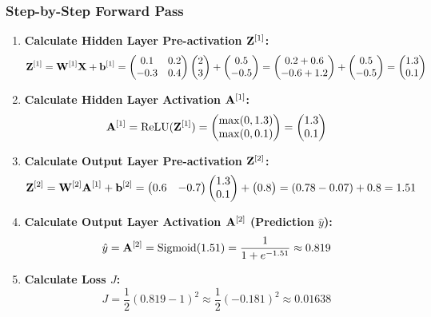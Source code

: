 \subsubsection{Step-by-Step Forward Pass}
\begin{enumerate}
    \item \textbf{Calculate Hidden Layer Pre-activation $\mathbf{Z}^{[1]}$:}
    \[ \mathbf{Z}^{[1]} = \mathbf{W}^{[1]}\mathbf{X} + \mathbf{b}^{[1]} = \begin{pmatrix} 0.1 & 0.2 \\ -0.3 & 0.4 \end{pmatrix} \begin{pmatrix} 2 \\ 3 \end{pmatrix} + \begin{pmatrix} 0.5 \\ -0.5 \end{pmatrix} = \begin{pmatrix} 0.2+0.6 \\ -0.6+1.2 \end{pmatrix} + \begin{pmatrix} 0.5 \\ -0.5 \end{pmatrix} = \begin{pmatrix} 1.3 \\ 0.1 \end{pmatrix} \]

    \item \textbf{Calculate Hidden Layer Activation $\mathbf{A}^{[1]}$:}
    \[ \mathbf{A}^{[1]} = \text{ReLU}(\mathbf{Z}^{[1]}) = \begin{pmatrix} \max(0, 1.3) \\ \max(0, 0.1) \end{pmatrix} = \begin{pmatrix} 1.3 \\ 0.1 \end{pmatrix} \]

    \item \textbf{Calculate Output Layer Pre-activation $\mathbf{Z}^{[2]}$:}
    \[ \mathbf{Z}^{[2]} = \mathbf{W}^{[2]}\mathbf{A}^{[1]} + \mathbf{b}^{[2]} = \begin{pmatrix} 0.6 & -0.7 \end{pmatrix} \begin{pmatrix} 1.3 \\ 0.1 \end{pmatrix} + \begin{pmatrix} 0.8 \end{pmatrix} = (0.78 - 0.07) + 0.8 = 1.51 \]

    \item \textbf{Calculate Output Layer Activation $\mathbf{A}^{[2]}$ (Prediction $\hat{y}$):}
    \[ \hat{y} = \mathbf{A}^{[2]} = \text{Sigmoid}(1.51) = \frac{1}{1 + e^{-1.51}} \approx 0.819 \]

    \item \textbf{Calculate Loss $J$:}
    \[ J = \frac{1}{2}(0.819 - 1)^2 \approx \frac{1}{2}(-0.181)^2 \approx 0.01638 \]
\end{enumerate}

